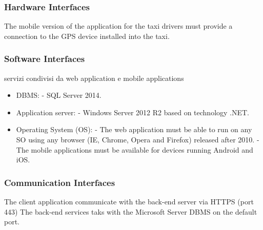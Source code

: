 \subsubsection{Hardware Interfaces}
	The mobile version of the application for the taxi drivers must provide a connection to the GPS device installed into the taxi.
	
\subsubsection{Software Interfaces}
	servizi condivisi da web application e mobile applications
	\begin{itemize}
		\item DBMS: \newline
		- SQL Server 2014.
		\item Application server: \newline
		- Windows Server 2012 R2 based on technology .NET.
		\item Operating System (OS): \newline
		- The web application must be able to run on any SO using any browser (IE, Chrome, Opera and Firefox) released after 2010. \newline
		- The mobile applications must be available for devices running Android and iOS.
	\end{itemize}
	
\subsubsection{Communication Interfaces}
	The client application communicate with the back-end server via HTTPS (port 443)
	The back-end services taks with the Microsoft Server DBMS on the default port.